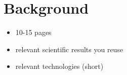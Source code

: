 \section{Background}
\label{sec:background}

\begin{itemize} 
    \item 10-15 pages
    \item relevant scientific results you reuse 
    \item relevant technologies (short)
\end{itemize}

